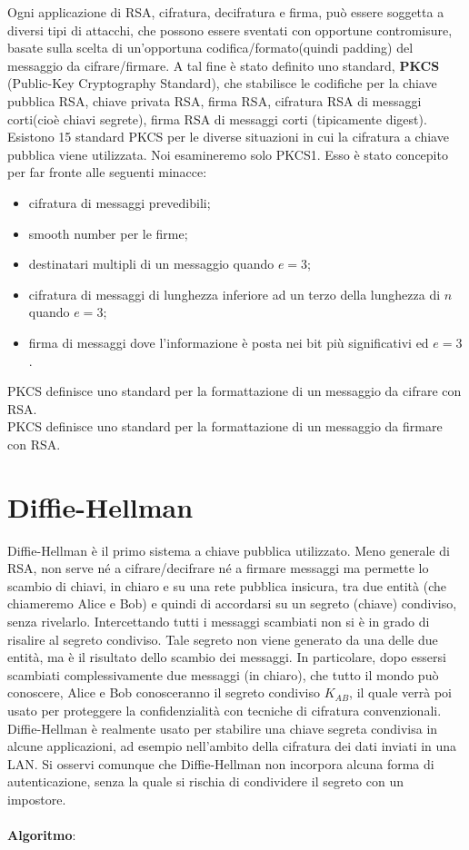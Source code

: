 Ogni applicazione di RSA, cifratura, decifratura e firma, può essere soggetta a diversi tipi di attacchi, che possono essere sventati con opportune contromisure, basate sulla scelta di un'opportuna codifica/formato(quindi padding) del messaggio da cifrare/firmare. A tal fine è stato definito uno standard, \textbf{PKCS} (Public-Key Cryptography Standard), che stabilisce le codifiche per la chiave pubblica RSA, chiave privata RSA, firma RSA, cifratura RSA di messaggi corti(cioè chiavi segrete), firma RSA di messaggi corti (tipicamente digest). \\
Esistono 15 standard PKCS per le diverse situazioni in cui la cifratura a chiave pubblica viene utilizzata. Noi esamineremo solo PKCS1. Esso è stato concepito per far fronte alle seguenti minacce:
\begin{itemize}
\item cifratura di messaggi prevedibili;
\item smooth number per le firme;
\item destinatari multipli di un messaggio quando $e=3$;
\item cifratura di messaggi di lunghezza inferiore ad un terzo della lunghezza di $n$ quando $e=3$;
\item firma di messaggi dove l'informazione è posta nei bit più significativi ed $e = 3$.
\end{itemize}
PKCS definisce uno standard per la formattazione di un messaggio da cifrare con RSA. \\
PKCS definisce uno standard per la formattazione di un messaggio da firmare con RSA.

\section{Diffie-Hellman}

Diffie-Hellman è il primo sistema a chiave pubblica utilizzato. Meno generale di RSA, non serve né a cifrare/decifrare né a firmare messaggi ma permette lo scambio di chiavi, in chiaro e su una rete pubblica insicura, tra due entità (che chiameremo Alice e Bob) e quindi di accordarsi su un segreto (chiave) condiviso, senza rivelarlo. Intercettando tutti i messaggi scambiati non si è in grado di risalire al segreto condiviso. Tale segreto non viene generato da una delle due entità, ma è il risultato dello scambio dei messaggi. In particolare, dopo essersi scambiati complessivamente due messaggi (in chiaro), che tutto il mondo può conoscere, Alice e Bob conosceranno il segreto condiviso $K_{AB}$, il quale verrà poi usato per proteggere la confidenzialità con tecniche di cifratura convenzionali. \\ Diffie-Hellman è realmente usato per stabilire una chiave segreta condivisa in alcune applicazioni, ad esempio nell'ambito della cifratura dei dati inviati in una LAN. Si osservi comunque che Diffie-Hellman non
incorpora alcuna forma di autenticazione, senza la quale si rischia di condividere il segreto con un impostore.  \\ \\
\textbf{Algoritmo}: \\

